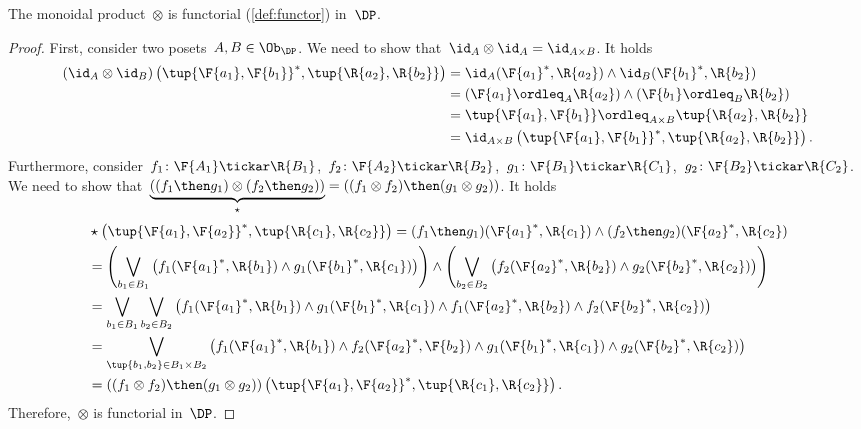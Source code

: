 \begin{lemma}
\label{lemma:monoidal_functorial}
The monoidal product~$\otimes$ is functorial (\cref{def:functor}) in~$\DP$.
\end{lemma}
\begin{proof}
First, consider two posets~$A,B\in \Ob_\DP$. We need to show that~$\id_A\otimes \id_A = \id_{A\times B}$. It holds
\begin{equation}
\begin{aligned}
    \left( \id_{A}\otimes \id_{B}\right)
    \left( \tup{\F{a_1},\F{b_1}}^*,\tup{\R{a_2},\R{b_2}}\right)&=
    \id_A(\F{a_1}^*,\R{a_2})\wedge \id_B(\F{b_1}^*,\R{b_2})\\
    &=\left( \F{a_1}\ordleq_A \R{a_2}\right)\wedge \left( \F{b_1}\ordleq_B \R{b_2}\right)\\
    &=\tup{\F{a_1},\F{b_1}}\ordleq_{A\times B}\tup{\R{a_2},\R{b_2}}\\
    &=\id_{A\times B}\left( \tup{\F{a_1},\F{b_1}}^*,\tup{\R{a_2},\R{b_2}}\right).
\end{aligned}
\end{equation}
Furthermore, consider~$f_1\colon \F{A_1} \tickar \R{B_1}$,~$f_2\colon \F{A_2}\tickar \R{B_2}$,~$g_1\colon \F{B_1}\tickar \R{C_1}$,~$g_2\colon \F{B_2}\tickar \R{C_2}$. We need to show that~$\underbrace{\left( (f_1\then g_1) \otimes (f_2\then g_2)\right)}_{\star}=\left( (f_1\otimes f_2)\then (g_1\otimes g_2)\right)$. It holds
\begin{equation}
\begin{aligned}
    &\star \left( \tup{\F{a_1},\F{a_2}}^*,\tup{\R{c_1},\R{c_2}}\right)=(f_1\then g_1)(\F{a_1}^*,\R{c_1})\wedge (f_2\then g_2)(\F{a_2}^*,\R{c_2})\\
    &=\left(\bigvee_{b_1\in B_1}\left( f_1(\F{a_1}^*,\R{b_1})\wedge g_1(\F{b_1}^*,\R{c_1})\right)\right) \wedge\left(\bigvee_{b_2\in B_2}\left( f_2(\F{a_2}^*,\R{b_2})\wedge g_2(\F{b_2}^*,\R{c_2})\right)\right)\\
    &=\bigvee_{b_1\in B_1}\bigvee_{b_2\in B_2} \left(f_1(\F{a_1}^*,\R{b_1})\wedge g_1(\F{b_1}^*,\R{c_1})\wedge f_1(\F{a_2}^*,\R{b_2})\wedge f_2(\F{b_2}^*,\R{c_2}) \right)\\
    &=\bigvee_{\tup{b_1,b_2}\in B_1\times B_2} \left(f_1(\F{a_1}^*,\R{b_1})\wedge f_2(\F{a_2}^*,\F{b_2})\wedge g_1(\F{b_1}^*,\R{c_1})\wedge g_2(\F{b_2}^*,\R{c_2}) \right)\\
    &=\left( (f_1\otimes f_2)\then (g_1\otimes g_2)\right)\left(\tup{\F{a_1},\F{a_2}}^*,\tup{\R{c_1},\R{c_2}} \right).
\end{aligned}
\end{equation}
Therefore,~$\otimes$ is functorial in~$\DP$.
\end{proof}


